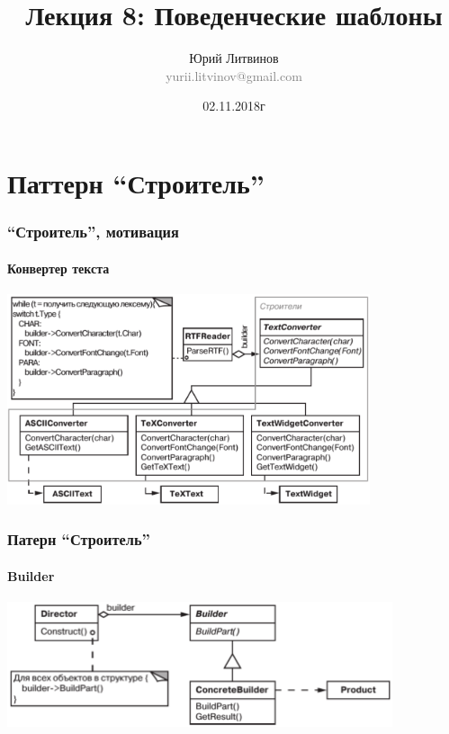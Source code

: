 \documentclass[xetex,mathserif,serif]{beamer}
\title[Шаблоны]{Лекция 8: Поведенческие шаблоны}
\author[Юрий Литвинов]{Юрий Литвинов\\\small{\textcolor{gray}{yurii.litvinov@gmail.com}}}
\date{02.11.2018г}
\begin{document}
	\frame{\titlepage}

	\section{Паттерн ``Строитель''}

	\begin{frame}
		\frametitle{``Строитель'', мотивация}
		\framesubtitle{Конвертер текста}
		\begin{center}
			\includegraphics[width=0.8\textwidth]{textConverter.png}
		\end{center}
	\end{frame}

	\begin{frame}
		\frametitle{Патерн ``Строитель''}
		\framesubtitle{Builder}
		\begin{center}
			\includegraphics[width=0.85\textwidth]{builder.png}
		\end{center}
	\end{frame}
	
\end{document}
